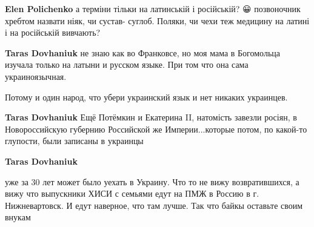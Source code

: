 \begin{itemize}
\begin{itemize}
 
\textbf{Elen Polichenko} а терміни тільки на латинській і російській? 😀
позвоночник хребтом назвати ніяк, чи сустав- суглоб. Поляки, чи чехи теж
медицину на латині і на російській вивчають?

 
\textbf{Taras Dovhaniuk} не знаю как во Франковсе, но моя мама в Богомольца изучала только на латыни и русском языке. При том что она сама украиноязычная.

 
Потому и один народ, что убери украинский язык и нет никаких украинцев.

 
\textbf{Taras Dovhaniuk} Ещё Потёмкин и Екатерина II, натомість завезли росіян,
в Новороссийскую губернию Российской же Империи...которые потом, по какой-то
глупости, были записаны в украинцы

 
\textbf{Taras Dovhaniuk} 

уже за 30 лет может было уехать в Украину. Что то не
вижу возвратившихся, а вижу что выпускники ХИСИ с семьями едут на ПМЖ в Россию в
г. Нижневартовск. И едут наверное, что там лучше. Так что байкы оставьте своим
внукам



\end{itemize}
\end{itemize}
